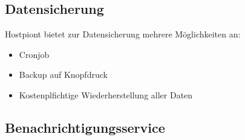  


\subsection{Datensicherung}
Hostpiont bietet zur Datensicherung mehrere Möglichkeiten an:
\begin{itemize}
\item Cronjob
\item Backup auf Knopfdruck
\item Kostenplfichtige Wiederherstellung aller Daten
\end{itemize}








\subsection{Benachrichtigungsservice}

